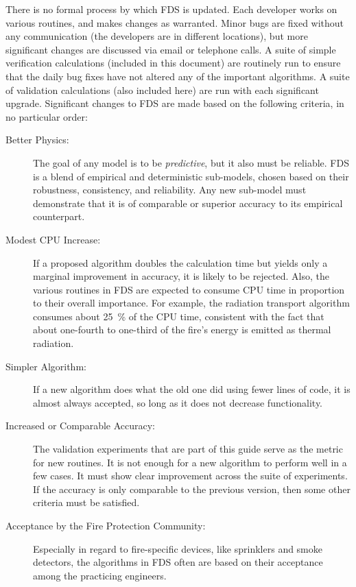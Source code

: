 \documentclass[11pt]{book}
\begin{document}
There is no formal process by which FDS is updated. Each developer works on various routines, and makes changes as warranted. Minor bugs are fixed
without any communication (the developers are in different locations), but more significant changes are discussed via email or telephone calls. A
suite of simple verification calculations (included in this document) are routinely run to ensure that the daily bug fixes have not altered any of
the important algorithms. A suite of validation calculations (also included here) are run with each significant upgrade. Significant changes to FDS
are made based on the following criteria, in no particular order:
\begin{description}
\item[Better Physics:] The goal of any model is to be {\em predictive}, but it also must be reliable. FDS is a blend of empirical and
deterministic sub-models, chosen based on their robustness, consistency, and reliability. Any new sub-model must demonstrate that it is of comparable
or superior accuracy to its empirical counterpart.
\item[Modest CPU Increase:] If a proposed algorithm doubles the calculation time but yields only a marginal improvement in accuracy, it is
likely to be rejected. Also, the various routines in FDS are expected to consume CPU time in proportion to their overall importance. For example, the
radiation transport algorithm consumes about 25~\% of the CPU time, consistent with the fact that about one-fourth to one-third of the fire's energy
is emitted as thermal radiation.
\item[Simpler Algorithm:] If a new algorithm does what the old one did using fewer lines of code, it is almost always accepted, so long as
it does not decrease functionality.
\item[Increased or Comparable Accuracy:] The validation experiments that are part of this guide serve as the metric for new routines. It is
not enough for a new algorithm to perform well in a few cases. It must show clear improvement across the suite of experiments. If the accuracy is
only comparable to the previous version, then some other criteria must be satisfied.
\item[Acceptance by the Fire Protection Community:] Especially in regard to fire-specific devices, like sprinklers and smoke detectors, the
algorithms in FDS often are based on their acceptance among the practicing engineers.
\end{description}
\end{document}
